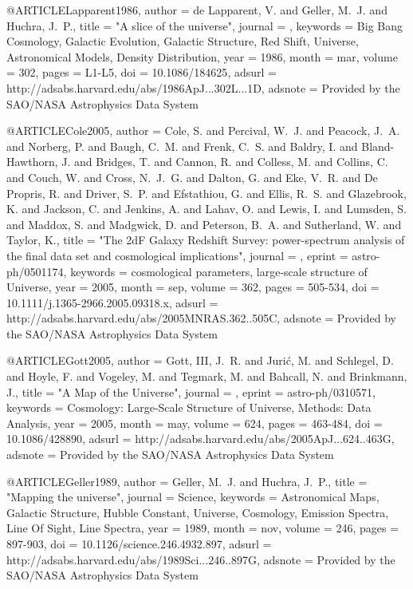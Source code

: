 \documentclass{aa}
\begin{document}
{{{{{{{{{{{{{@ARTICLE{Lapparent1986,
   author = {{de Lapparent}, V. and {Geller}, M.~J. and {Huchra}, J.~P.},
    title = "{A slice of the universe}",
  journal = {\apjl},
 keywords = {Big Bang Cosmology, Galactic Evolution, Galactic Structure, Red Shift, Universe, Astronomical Models, Density Distribution},
     year = 1986,
    month = mar,
   volume = 302,
    pages = {L1-L5},
      doi = {10.1086/184625},
   adsurl = {http://adsabs.harvard.edu/abs/1986ApJ...302L...1D},
  adsnote = {Provided by the SAO/NASA Astrophysics Data System}
}

@ARTICLE{Cole2005,
   author = {{Cole}, S. and {Percival}, W.~J. and {Peacock}, J.~A. and {Norberg}, P. and 
	{Baugh}, C.~M. and {Frenk}, C.~S. and {Baldry}, I. and {Bland-Hawthorn}, J. and 
	{Bridges}, T. and {Cannon}, R. and {Colless}, M. and {Collins}, C. and 
	{Couch}, W. and {Cross}, N.~J.~G. and {Dalton}, G. and {Eke}, V.~R. and 
	{De Propris}, R. and {Driver}, S.~P. and {Efstathiou}, G. and 
	{Ellis}, R.~S. and {Glazebrook}, K. and {Jackson}, C. and {Jenkins}, A. and 
	{Lahav}, O. and {Lewis}, I. and {Lumsden}, S. and {Maddox}, S. and 
	{Madgwick}, D. and {Peterson}, B.~A. and {Sutherland}, W. and 
	{Taylor}, K.},
    title = "{The 2dF Galaxy Redshift Survey: power-spectrum analysis of the final data set and cosmological implications}",
  journal = {\mnras},
   eprint = {astro-ph/0501174},
 keywords = {cosmological parameters, large-scale structure of Universe},
     year = 2005,
    month = sep,
   volume = 362,
    pages = {505-534},
      doi = {10.1111/j.1365-2966.2005.09318.x},
   adsurl = {http://adsabs.harvard.edu/abs/2005MNRAS.362..505C},
  adsnote = {Provided by the SAO/NASA Astrophysics Data System}
}

@ARTICLE{Gott2005,
   author = {{Gott}, III, J.~R. and {Juri{\'c}}, M. and {Schlegel}, D. and 
	{Hoyle}, F. and {Vogeley}, M. and {Tegmark}, M. and {Bahcall}, N. and 
	{Brinkmann}, J.},
    title = "{A Map of the Universe}",
  journal = {\apj},
   eprint = {astro-ph/0310571},
 keywords = {Cosmology: Large-Scale Structure of Universe, Methods: Data Analysis},
     year = 2005,
    month = may,
   volume = 624,
    pages = {463-484},
      doi = {10.1086/428890},
   adsurl = {http://adsabs.harvard.edu/abs/2005ApJ...624..463G},
  adsnote = {Provided by the SAO/NASA Astrophysics Data System}
}

@ARTICLE{Geller1989,
   author = {{Geller}, M.~J. and {Huchra}, J.~P.},
    title = "{Mapping the universe}",
  journal = {Science},
 keywords = {Astronomical Maps, Galactic Structure, Hubble Constant, Universe, Cosmology, Emission Spectra, Line Of Sight, Line Spectra},
     year = 1989,
    month = nov,
   volume = 246,
    pages = {897-903},
      doi = {10.1126/science.246.4932.897},
   adsurl = {http://adsabs.harvard.edu/abs/1989Sci...246..897G},
  adsnote = {Provided by the SAO/NASA Astrophysics Data System}
}

}}}}}}}}}}}}}
\end{document}
